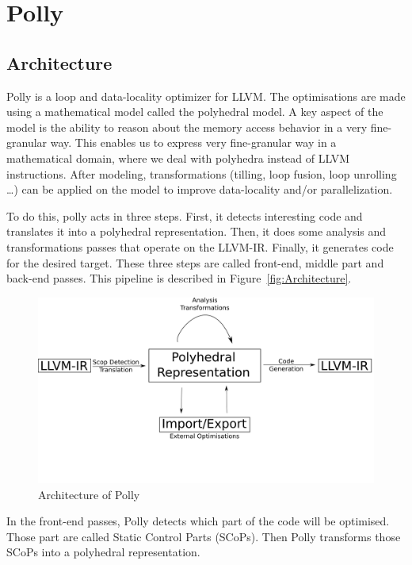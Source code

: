 \chapter{Polly}\label{ch:Polly}

\section{Architecture}
Polly is a loop and data-locality optimizer for LLVM. The optimisations are made using a mathematical model called the polyhedral model. A key aspect of the model is the ability to reason about the memory access behavior in a very fine-granular way. This enables us to express very fine-granular way in a mathematical domain, where we deal with polyhedra instead of LLVM instructions. After modeling, transformations (tilling, loop fusion, loop unrolling …) can be applied on the model to improve data-locality and/or parallelization.

To do this, polly acts in three steps. First, it detects interesting code and translates it into a polyhedral representation. Then, it does some analysis and transformations passes that operate on the LLVM-IR. Finally, it generates code for the desired target. These three steps are called front-end, middle part and back-end passes. This pipeline is described in Figure~\ref{fig:Architecture}.

\begin{figure}
\centering
\includegraphics[scale=0.4]{gfx/Polly/Architecture.png}
\caption{Architecture of Polly}
\label{fig:PollyArchitecture}
\end{figure}

In the front-end passes, Polly detects which part of the code will be optimised. Those part are called Static Control Parts (SCoPs). Then Polly transforms those SCoPs into a polyhedral representation. 

